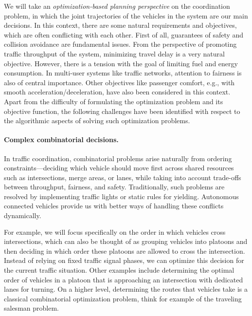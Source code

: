 \documentclass[a4paper]{report}
\theoremstyle{definition}
\theoremstyle{plain}
\begin{document}
%
We will take an \emph{optimization-based planning perspective} on the
coordination problem, in which the joint trajectories of the vehicles in the
system are our main decisions.
%
%
In this context, there are some natural requirements and objectives, which are
often conflicting with each other.
%
First of all, guarantees of safety and collision avoidance are fundamental issues.
%
From the perspective of promoting traffic throughput of the system, minimizing
travel delay is a very natural objective. However, there is a tension with the
goal of limiting fuel and energy consumption.
%
In multi-user systems like traffic networks, attention to fairness is also
of central importance.
%
Other objectives like passenger comfort, e.g., with smooth
acceleration/deceleration, have also been considered in this context.
%
Apart from the difficulty of formulating the optimization problem and its
objective function, the following challenges have been identified with respect
to the algorithmic aspects of solving such optimization problems.



\paragraph{Complex combinatorial decisions.}

In traffic coordination, combinatorial problems arise naturally from ordering
constraints---deciding which vehicle should move first across shared resources
such as intersections, merge areas, or lanes, while taking into account trade-offs
between throughput, fairness, and safety.
%
Traditionally, such problems are resolved by implementing traffic lights or
static rules for yielding.
%
Autonomous connected vehicles provide us with better ways of handling these
conflicts dynamically.

For example, we will focus specifically on the order in which vehicles cross
intersections, which can also be thought of as grouping vehicles into platoons
and then deciding in which order these platoons are allowed to cross the
intersection.
%
Instead of relying on fixed traffic signal phases, we can optimize this decision
for the current traffic situation.
%
Other examples include determining the optimal order of vehicles in a
platoon that is approaching an intersection with dedicated lanes for turning.
%
On a higher level, determining the routes that vehicles take is a classical
combinatorial optimization problem, think for example of the traveling salesman
problem.
\end{document}
